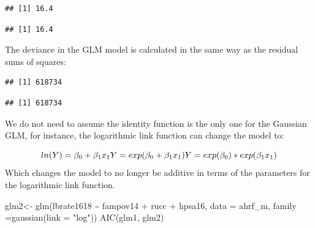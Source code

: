 \documentclass[
]{article}
\newenvironment{Shaded}{\begin{snugshade}}{\end{snugshade}}
\newcommand{\AttributeTok}[1]{\textcolor[rgb]{0.77,0.63,0.00}{#1}}
\newcommand{\DecValTok}[1]{\textcolor[rgb]{0.00,0.00,0.81}{#1}}
\newcommand{\FunctionTok}[1]{\textcolor[rgb]{0.00,0.00,0.00}{#1}}
\newcommand{\NormalTok}[1]{#1}
\newcommand{\OtherTok}[1]{\textcolor[rgb]{0.56,0.35,0.01}{#1}}
\newcommand{\SpecialCharTok}[1]{\textcolor[rgb]{0.00,0.00,0.00}{#1}}
\newcommand{\StringTok}[1]{\textcolor[rgb]{0.31,0.60,0.02}{#1}}
\begin{document}
\begin{verbatim}
## [1] 16.4
\end{verbatim}

\begin{Shaded}
\end{Shaded}

\begin{verbatim}
## [1] 16.4
\end{verbatim}

The deviance in the GLM model is calculated in the same way as the residual sums of squares:

\begin{Shaded}
\end{Shaded}

\begin{verbatim}
## [1] 618734
\end{verbatim}

\begin{Shaded}
\end{Shaded}

\begin{verbatim}
## [1] 618734
\end{verbatim}

We do not need to assume the identity function is the only one for the Gaussian GLM, for instance, the logarithmic link function can change the model to:

\[
ln(Y) = \beta_0 + \beta_1 x_1 \\
Y = exp(\beta_0 + \beta_1 x_1) \\
Y = exp(\beta_0) * exp(\beta_1 x_1)
\]
Which changes the model to no longer be additive in terms of the parameters for the logarithmic link function.

\begin{Shaded}
\begin{Highlighting}[]
\NormalTok{glm2}\OtherTok{\textless{}{-}} \FunctionTok{glm}\NormalTok{(lbrate1618 }\SpecialCharTok{\textasciitilde{}}\NormalTok{  fampov14 }\SpecialCharTok{+}\NormalTok{ rucc }\SpecialCharTok{+}\NormalTok{ hpsa16,}
          \AttributeTok{data =}\NormalTok{ ahrf\_m, }
          \AttributeTok{family =}\FunctionTok{gaussian}\NormalTok{(}\AttributeTok{link =} \StringTok{"log"}\NormalTok{))}
\FunctionTok{AIC}\NormalTok{(glm1, glm2)}
\end{Highlighting}
\end{Shaded}
\end{document}
